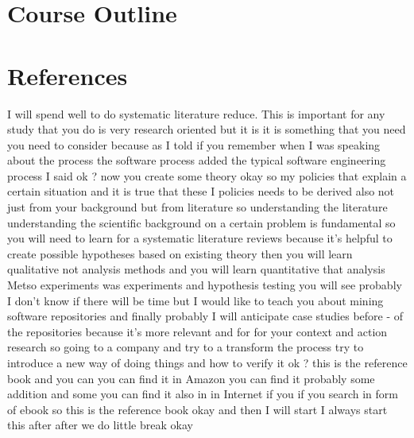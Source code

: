 \documentclass[conference, compsoc, twoside]{IEEEtran}
\begin{document}
 

\section{Course Outline}

\section{References}
I will spend well to do systematic literature reduce. 
This is important for any study that you do is very research oriented but it is it is something that you need you need to consider because as I told if you remember when I was speaking about the process the software process added the typical software engineering process I said ok ? now you create some theory okay so my policies that explain a certain situation and it is true that these I policies needs to be derived also not just from your background but from literature so understanding the literature understanding the scientific background on a certain problem is fundamental so you will need to learn for a systematic literature reviews because it's helpful to create possible hypotheses based on existing theory then you will learn qualitative not analysis methods and you will learn quantitative that analysis Metso experiments was experiments and hypothesis testing you will see probably I don't know if there will be time but I would like to teach you about mining software repositories and finally probably I will anticipate case studies before - of the repositories because it's more relevant and for for your context and action research so going to a company and try to a transform the process try to introduce a new way of doing things and how to verify it ok ? this is the reference book and you can you can find it in Amazon you can find it probably some addition and some you can find it also in in Internet if you if you search in form of ebook so this is the reference book okay and then I will start I always start this after after we do little break okay 


\end{document}
